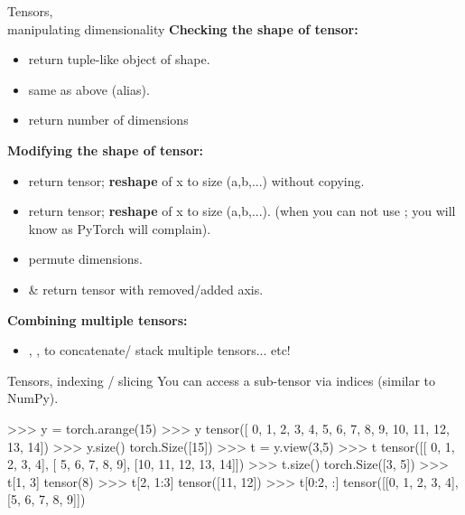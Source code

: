 \begin{frame}{Tensors,\\ manipulating dimensionality}
\textbf{Checking the shape of tensor:}
\begin{itemize}
\item {}  return tuple-like object of shape.
\item {}  same as above (alias).
\item {}  return number of dimensions
\end{itemize}
\vsp
\pause
\textbf{Modifying the shape of tensor:}
\begin{itemize}
\item {}  return tensor; \textbf{reshape} of x to size (a,b,...) without copying.
\item {}  return tensor; \textbf{reshape} of x to size (a,b,...). (when you can not use ; you will know as PyTorch will complain).
\item  {}  permute dimensions.
\item  {} \&   return tensor with removed/added axis.
\end{itemize}
\vsp
\pause
\textbf{Combining multiple tensors:}
\begin{itemize}
\item  {}, , to concatenate/ stack multiple tensors... etc!
\end{itemize}
\pause
\vsp
{}
\end{frame}

\begin{frame}[fragile]{Tensors, indexing / slicing}
\vspace{-7mm}
You can access a sub-tensor via indices (similar to NumPy).
\begin{python}
>>> y = torch.arange(15)
>>> y
tensor([ 0,  1,  2,  3,  4,  5,  6,  7,  8,  9, 10, 11, 12, 13, 14])
>>> y.size()
torch.Size([15])
>>> t = y.view(3,5)
>>> t
tensor([[ 0,  1,  2,  3,  4],
        [ 5,  6,  7,  8,  9],
        [10, 11, 12, 13, 14]])
>>> t.size()
torch.Size([3, 5])
>>> t[1, 3]
tensor(8)
>>> t[2, 1:3]
tensor([11, 12])
>>> t[0:2, :]
tensor([[0, 1, 2, 3, 4],
        [5, 6, 7, 8, 9]])
\end{python}
\end{frame}

